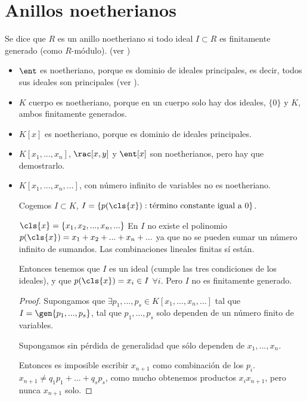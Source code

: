 \section{Anillos noetherianos}
\begin{defn}
	Se dice que $R$ es un anillo noetheriano si todo ideal $I \subset R$ es finitamente generado (como $R$-módulo). (ver )
	
\end{defn}

\begin{example}
	\begin{itemize}
	\item $\ent$ es noetheriano, porque es dominio de ideales principales, es decir, todos sus ideales son principales (ver ).
	\item $K$ cuerpo es noetheriano, porque en un cuerpo solo hay dos ideales, $\{0\}$ y $K$, ambos finitamente generados.
	\item $K[x]$ es noetheriano, porque es dominio de ideales principales.
	\item $K[x_1,...,x_n]$, $\rac[x,y]$ y $\ent[x]$ son noetherianos, pero hay que demostrarlo.
	\item $K[x_1,...,x_n,...]$, con número infinito de variables no es noetheriano.
	
	Cogemos $I \subset K$, $I= \{ p(\cls{x}): \text{término constante igual a 0} \}$.
	
	\notacion $\cls{x}=\{x_1,x_2,...,x_n,...\}$
	\nota En $I$ no existe el polinomio $p(\cls{x})=x_1+x_2+...+x_n+...$ ya que no se pueden sumar un número infinito de sumandos. Las combinaciones lineales finitas sí están.
	
	Entonces tenemos que $I$ es un ideal (cumple las tres condiciones de los ideales), y que $p(\cls{x})=x_i \in I$ $ \forall i$. Pero $I$ no es finitamente generado.
	\begin{proof}
		Supongamos que $\exists p_1,...,p_s \in K[x_1,...,x_n,...]$ tal que $I=\gen{p_1,...,p_s}$, tal que $p_1,...,p_s$ solo dependen de un número finito de variables.
		
		Supongamos sin pérdida de generalidad que sólo dependen de $x_1,...,x_n$.
		
		Entonces es imposible escribir $x_{n+1}$ como combinación de los $p_i$. $x_{n+1}\neq q_1p_1+...+q_sp_s$, como mucho obtenemos productos $x_ix_{n+1}$, pero nunca $x_{n+1}$ solo.
	\end{proof}
	\end{itemize}
\end{example}

